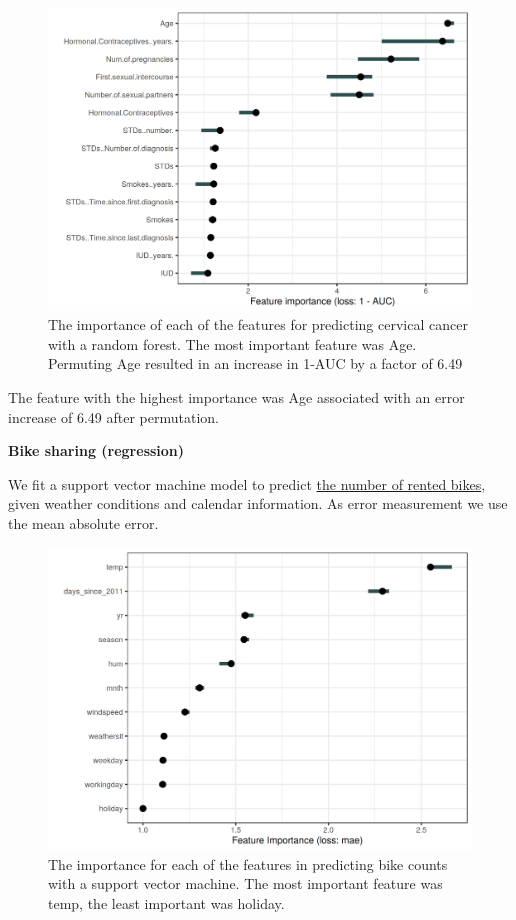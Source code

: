 \documentclass[12pt,]{krantz}
\begin{document}
\begin{figure}

{\centering \includegraphics[width=\textwidth]{images/importance-cervical-1} 

}

\caption{The importance of each of the features for predicting cervical cancer with a random forest. The most important feature was Age. Permuting Age resulted in an increase in 1-AUC by a factor of 6.49}\label{fig:importance-cervical}
\end{figure}

The feature with the highest importance was Age associated with an error
increase of 6.49 after permutation.

\textbf{Bike sharing (regression)}

We fit a support vector machine model to predict
\protect\hyperlink{bike-data}{the number of rented bikes}, given weather
conditions and calendar information. As error measurement we use the
mean absolute error.

\begin{figure}

{\centering \includegraphics[width=\textwidth]{images/importance-bike-1} 

}

\caption{The importance for each of the features in predicting bike counts with a support vector machine. The most important feature was temp, the least important was holiday.}\label{fig:importance-bike}
\end{figure}
\end{document}
